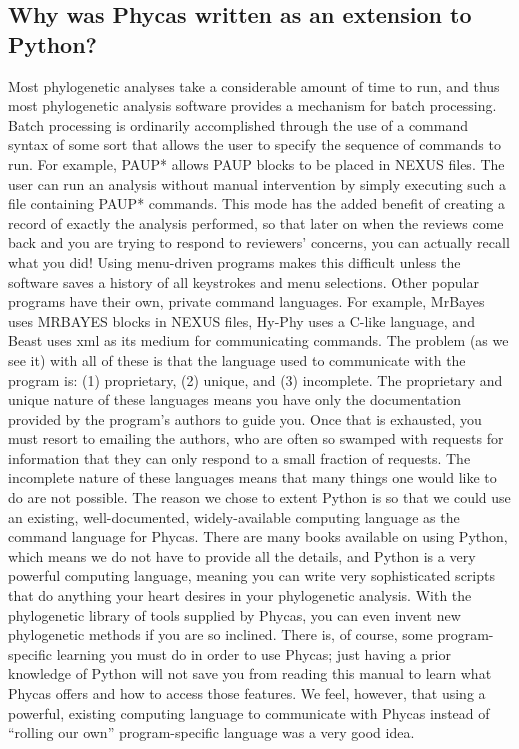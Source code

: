 \documentclass[10pt]{article}
\begin{document}
\subsection{Why was Phycas written as an extension to Python?}
Most phylogenetic analyses take a considerable amount of time to run, and thus most phylogenetic analysis software provides a mechanism for batch processing. 
Batch processing is ordinarily accomplished through the use of a command syntax of some sort that allows the user to specify the sequence of commands to run. For example, PAUP* allows PAUP blocks to be placed in NEXUS files. The user can run an analysis without manual intervention by simply executing such a file containing PAUP* commands. 
This mode has the added benefit of creating a record of exactly the analysis performed, so that later on when the reviews come back and you are trying to respond to reviewers' concerns, you can actually recall what you did! 
Using menu-driven programs makes this difficult unless the software saves a history of all keystrokes and menu selections. 
Other popular programs have their own, private command languages. 
For example, MrBayes uses MRBAYES blocks in NEXUS files, Hy-Phy uses a C-like language, and Beast uses xml as its medium for communicating commands. The problem (as we see it) with all of these is that the language used to communicate with the program is: (1) proprietary, (2) unique, and (3) incomplete. 
The proprietary and unique nature of these languages means you have only the documentation provided by the program's authors to guide you. 
Once that is exhausted, you must resort to emailing the authors, who are often so swamped with requests for information that they can only respond to a small fraction of requests. 
The incomplete nature of these languages means that many things one would like to do are not possible. 
The reason we chose to extent Python is so that we could use an existing, well-documented, widely-available computing language as the command language for Phycas. 
There are many books available on using Python, which means we do not have to provide all the details, and Python is a very powerful computing language, meaning you can write very sophisticated scripts that do anything your heart desires in your phylogenetic analysis. 
With the phylogenetic library of tools supplied by Phycas, you can even invent new phylogenetic methods if you are so inclined. 
There is, of course, some program-specific learning you must do in order to use Phycas; just having a prior knowledge of Python will not save you from reading this manual to learn what Phycas offers and how to access those features.
We feel, however, that using a powerful, existing computing language to communicate with Phycas instead of ``rolling our own'' program-specific language was a very good idea.
\end{document}
